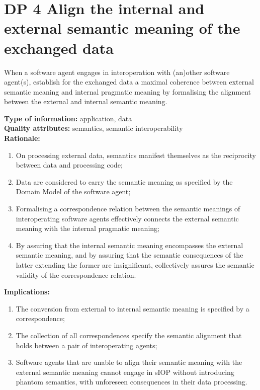 \documentclass[sort&compress,preprint,authoryear,3p,twocolumn]{elsarticle}
\begin{document}
\hypertarget{dp-4-align-the-internal-and-external-semantic-meaning-of-the-exchanged-data}{%
\section{DP 4 Align the internal and external semantic meaning of the
exchanged
data}\label{dp-4-align-the-internal-and-external-semantic-meaning-of-the-exchanged-data}}

\begin{mmdp}\label{dp:alignment}

When a software agent engages in interoperation with (an)other software agent(s), establish for the exchanged data a maximal coherence between external semantic meaning and internal pragmatic meaning by formalising the alignment between the external and internal semantic meaning.   

\textbf{Type of information:} application, data  \\
\textbf{Quality attributes:} semantics, semantic interoperability   \\
\textbf{Rationale:}
\begin{enumerate}
  \item On processing external data, semantics manifest themselves as the reciprocity between data and processing code;
  \item Data are considered to carry the semantic meaning as specified by the Domain Model of the software agent;
  \item Formalising a correspondence relation between the semantic meanings of interoperating software agents effectively connects the external semantic meaning with the internal pragmatic meaning;
  \item By assuring that the internal semantic meaning encompasses the external semantic meaning, and by assuring that the semantic consequences of the latter extending the former are insignificant, collectively assures the semantic validity of the correspondence relation.
\end{enumerate}
\textbf{Implications:}
\begin{enumerate}
  \item The conversion from external to internal semantic meaning is specified by a correspondence;
  \item The collection of all correspondences specify the semantic alignment that holds between a pair of interoperating agents;
  \item Software agents that are unable to align their semantic meaning with the external semantic meaning cannot engage in sIOP without introducing phantom semantics, with unforeseen consequences in their data processing.
\end{enumerate}  
\end{mmdp}
\end{document}
